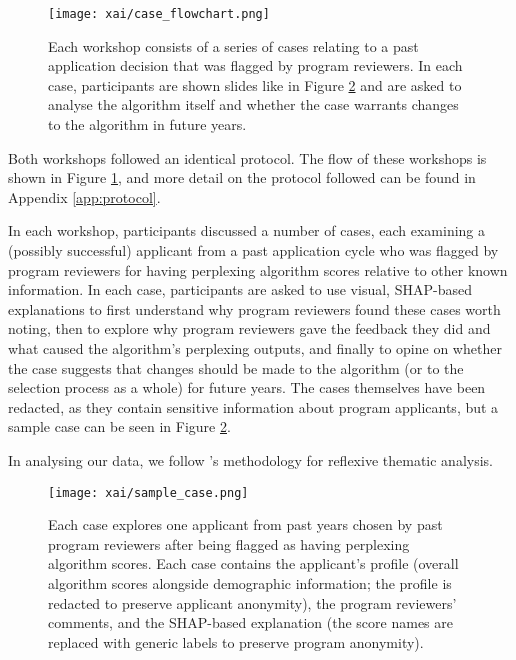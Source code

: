 \begin{figure}[htbp]
    \centering
    \texttt{[image: xai/case\_flowchart.png]}
    \caption{Each workshop consists of a series of cases relating to a past application decision that was flagged by program reviewers. In each case, participants are shown slides like in Figure \ref{fig:sample_case} and are asked to analyse the algorithm itself and whether the case warrants changes to the algorithm in future years.}
    \label{fig:case_flowchart}
\end{figure}

Both workshops followed an identical protocol. The flow of these workshops is shown in Figure \ref{fig:case_flowchart}, and more detail on the protocol followed can be found in Appendix \ref{app:protocol}.

In each workshop, participants discussed a number of cases, each examining a (possibly successful) applicant from a past application cycle who was flagged by program reviewers for having perplexing algorithm scores relative to other known information. In each case, participants are asked to use visual, SHAP-based explanations to first understand why program reviewers found these cases worth noting, then to explore why program reviewers gave the feedback they did and what caused the algorithm's perplexing outputs, and finally to opine on whether the case suggests that changes should be made to the algorithm (or to the selection process as a whole) for future years. The cases themselves have been redacted, as they contain sensitive information about program applicants, but a sample case can be seen in Figure \ref{fig:sample_case}.

In analysing our data, we follow \textcite{braun_using_2006}'s methodology for reflexive thematic analysis. 

\begin{figure}[htbp]
    \centering
    \texttt{[image: xai/sample\_case.png]}
    \caption{Each case explores one applicant from past years chosen by past program reviewers after being flagged as having perplexing algorithm scores. Each case contains the applicant's profile (overall algorithm scores alongside demographic information; the profile is redacted to preserve applicant anonymity), the program reviewers' comments, and the SHAP-based explanation (the score names are replaced with generic labels to preserve program anonymity).}
    \label{fig:sample_case}
    
\end{figure}

